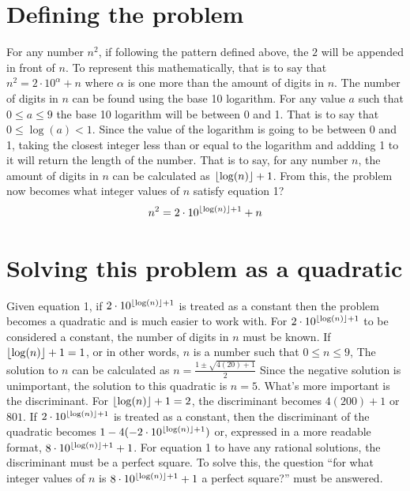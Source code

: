 \documentclass[a4paper, 12pt]{article}
\begin{document}
\section{Defining the problem}
For any number $n^2$, if following the pattern defined above, the $2$ will be appended in front of $n$. To represent this mathematically, that is to say that $n^2 = 2\cdot10^\alpha + n$ where $\alpha$ is one more than the amount of digits in $n$. The number of digits in $n$ can be found using the base 10 logarithm. For any value $a$ such that $0\leq a \leq 9$ the base 10 logarithm will be between 0 and 1. That is to say that  $0\leq \log(a) < 1$. Since the value of the logarithm is going to be between 0 and 1, taking the closest integer less than or equal to the logarithm and addding 1 to it will return the length of the number. That is to say, for any number $n$, the amount of digits in $n$ can be calculated as $\lfloor\log(n)\rfloor+1$. From this, the problem now becomes what integer values of $n$ satisfy equation 1? 
\begin{equation}
n^2=2\cdot10^{\lfloor\log(n)\rfloor+1}+n
\end{equation}
\section{Solving this problem as a quadratic}
Given equation 1, if $2\cdot10^{\lfloor\log(n)\rfloor+1}$ is treated as a constant then the problem becomes a quadratic and is much easier to work with. For $2\cdot10^{\lfloor\log(n)\rfloor+1}$ to be considered a constant, the number of digits in $n$ must be known. If $\lfloor\log(n)\rfloor+1 = 1$, or in other words, $n$ is a number such that $0\leq n \leq 9$, The solution to $n$ can be calculated as $n=\frac{1\pm\sqrt{4(20)+1}}{2}$ Since the negative solution is unimportant, the solution to this quadratic is $n=5$. What's more important is the discriminant. For $\lfloor\log(n)\rfloor+1 =2$, the discriminant becomes $4(200)+1$ or $801$. If $2\cdot10^{\lfloor\log(n)\rfloor+1}$ is treated as a constant, then the discriminant of the quadratic becomes $1 -4(-2\cdot10^{\lfloor\log(n)\rfloor+1})$ or, expressed in a more readable format, $8\cdot10^{\lfloor\log(n)\rfloor+1}+1$. For equation 1 to have any rational solutions, the discriminant must be a perfect square. To solve this, the question ``for what integer values of $n$ is $8\cdot10^{\lfloor\log(n)\rfloor+1}+1$ a perfect square?'' must be answered.
\end{document}
